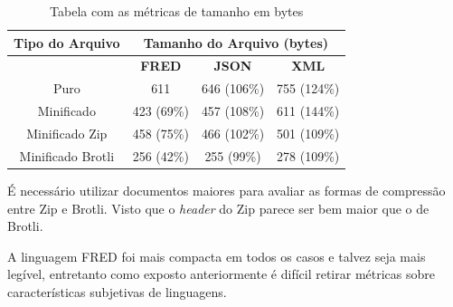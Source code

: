 \begin{table}[h!]
    \centering
	\caption{Tabela com as métricas de tamanho em bytes}
	\label{tbl:packagedocs}
    \begin{tabular}{cccc}
        \toprule
        \multicolumn{1}{c}{\textbf{Tipo do Arquivo}} & \multicolumn{3}{c}{\textbf{Tamanho do Arquivo (bytes)}} \\
        \midrule
                                                     & \textbf{FRED} & \textbf{JSON} & \textbf{XML}    \\
        \midrule
        Puro  & 611 & 646 (106\%) & 755 (124\%) \\
		Minificado & 423 (69\%) & 457 (108\%) & 611 (144\%) \\
        Minificado Zip & 458 (75\%) & 466 (102\%) & 501 (109\%)\\
        Minificado Brotli & 256 (42\%) & 255 (99\%) & 278 (109\%) \\
		\bottomrule
    \end{tabular}
\end{table}

É necessário utilizar documentos maiores para avaliar as formas de compressão entre
Zip e Brotli. Visto que o \textit{header} do Zip parece ser bem maior que o de 
Brotli.

A linguagem FRED foi mais compacta em todos os casos e talvez seja mais legível, entretanto
como exposto anteriormente é difícil retirar métricas sobre características subjetivas 
de linguagens.
